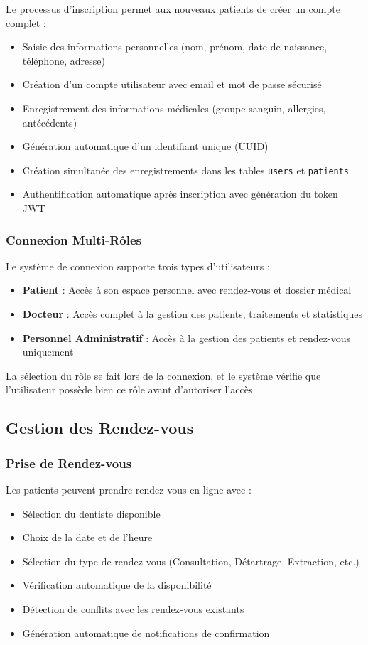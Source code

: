 \documentclass[12pt,a4paper]{report}
\begin{document}
Le processus d'inscription permet aux nouveaux patients de créer un compte complet :
\begin{itemize}
    \item Saisie des informations personnelles (nom, prénom, date de naissance, téléphone, adresse)
    \item Création d'un compte utilisateur avec email et mot de passe sécurisé
    \item Enregistrement des informations médicales (groupe sanguin, allergies, antécédents)
    \item Génération automatique d'un identifiant unique (UUID)
    \item Création simultanée des enregistrements dans les tables \texttt{users} et \texttt{patients}
    \item Authentification automatique après inscription avec génération du token JWT
\end{itemize}

\subsubsection{Connexion Multi-Rôles}

Le système de connexion supporte trois types d'utilisateurs :
\begin{itemize}
    \item \textbf{Patient} : Accès à son espace personnel avec rendez-vous et dossier médical
    \item \textbf{Docteur} : Accès complet à la gestion des patients, traitements et statistiques
    \item \textbf{Personnel Administratif} : Accès à la gestion des patients et rendez-vous uniquement
\end{itemize}

La sélection du rôle se fait lors de la connexion, et le système vérifie que l'utilisateur possède bien ce rôle avant d'autoriser l'accès.

\subsection{Gestion des Rendez-vous}

\subsubsection{Prise de Rendez-vous}

Les patients peuvent prendre rendez-vous en ligne avec :
\begin{itemize}
    \item Sélection du dentiste disponible
    \item Choix de la date et de l'heure
    \item Sélection du type de rendez-vous (Consultation, Détartrage, Extraction, etc.)
    \item Vérification automatique de la disponibilité
    \item Détection de conflits avec les rendez-vous existants
    \item Génération automatique de notifications de confirmation
\end{itemize}
\end{document}

